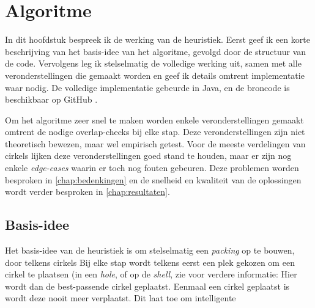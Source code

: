 \documentclass[12pt,a4paper,oneside]{book}
\begin{document}
{\chapter{Algoritme} \label{chap:algoritme}

In dit hoofdstuk bespreek ik de werking van de heuristiek.
Eerst geef ik een korte beschrijving van het basis-idee van het algoritme, gevolgd door de structuur van de code.
Vervolgens leg ik stelselmatig de volledige werking uit, samen met alle veronderstellingen die gemaakt worden en geef ik details omtrent implementatie waar nodig.
De volledige implementatie gebeurde in Java, en de broncode is beschikbaar op GitHub \cite{circle-packing-github}.

Om het algoritme zeer snel te maken worden enkele veronderstellingen gemaakt omtrent de nodige overlap-checks bij elke stap.
Deze veronderstellingen zijn niet theoretisch bewezen, maar wel empirisch getest. %
Voor de meeste verdelingen van cirkels lijken deze veronderstellingen goed stand te houden, maar er zijn nog enkele \textit{edge-cases} waarin er toch nog fouten gebeuren.
Deze problemen worden besproken in \autoref{chap:bedenkingen} en de snelheid en kwaliteit van de oplossingen wordt verder besproken in \autoref{chap:resultaten}.

\section{Basis-idee}

Het basis-idee van de heuristiek is om stelselmatig een \textit{packing} op te bouwen, door telkens cirkels %
Bij elke stap wordt telkens eerst een plek gekozen om een cirkel te plaatsen (in een \textit{hole}, of op de \textit{shell}, zie voor verdere informatie: %
Hier wordt dan de best-passende cirkel geplaatst.
Eenmaal een cirkel geplaatst is wordt deze nooit meer verplaatst.
Dit laat toe om intelligente %

}
\end{document}
